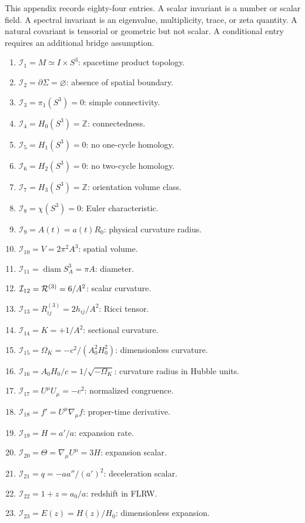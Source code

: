 \documentclass[
  aps,
  prd,
  reprint,
  superscriptaddress,
  nofootinbib,
  floatfix,
  longbibliography
]{revtex4-2}
\newcommand{\Inv}{\mathcal I}
\begin{document}
This appendix records eighty-four entries.  A scalar invariant is a
number or scalar field.  A spectral invariant is an eigenvalue,
multiplicity, trace, or zeta quantity.  A natural covariant is tensorial
or geometric but not scalar.  A conditional entry requires an additional
bridge assumption.

\begin{enumerate}
\item \(\Inv_1=M\simeq I\times S^3\): spacetime product topology.
\item \(\Inv_2=\partial\Sigma=\varnothing\): absence of spatial boundary.
\item \(\Inv_3=\pi_1(S^3)=0\): simple connectivity.
\item \(\Inv_4=H_0(S^3)=\mathbb Z\): connectedness.
\item \(\Inv_5=H_1(S^3)=0\): no one-cycle homology.
\item \(\Inv_6=H_2(S^3)=0\): no two-cycle homology.
\item \(\Inv_7=H_3(S^3)=\mathbb Z\): orientation volume class.
\item \(\Inv_8=\chi(S^3)=0\): Euler characteristic.
\item \(\Inv_9=A(t)=a(t)R_0\): physical curvature radius.
\item \(\Inv_{10}=V=2\pi^2A^3\): spatial volume.
\item \(\Inv_{11}=\operatorname{diam}S^3_A=\pi A\): diameter.
\item \(\Inv_{12}={\cal R}^{(3)}=6/A^2\): scalar curvature.
\item \(\Inv_{13}=R^{(3)}_{ij}=2h_{ij}/A^2\): Ricci tensor.
\item \(\Inv_{14}=K=+1/A^2\): sectional curvature.
\item \(\Inv_{15}=\Omega_K=-c^2/(A_0^2H_0^2)\): dimensionless curvature.
\item \(\Inv_{16}=A_0H_0/c=1/\sqrt{-\Omega_K}\): curvature radius in Hubble units.
\item \(\Inv_{17}=U^\mu U_\mu=-c^2\): normalized congruence.
\item \(\Inv_{18}=f'=U^\mu\nabla_\mu f\): proper-time derivative.
\item \(\Inv_{19}=H=a'/a\): expansion rate.
\item \(\Inv_{20}=\Theta=\nabla_\mu U^\mu=3H\): expansion scalar.
\item \(\Inv_{21}=q=-aa''/(a')^2\): deceleration scalar.
\item \(\Inv_{22}=1+z=a_0/a\): redshift in FLRW.
\item \(\Inv_{23}=E(z)=H(z)/H_0\): dimensionless expansion.

\end{enumerate}
\end{document}
